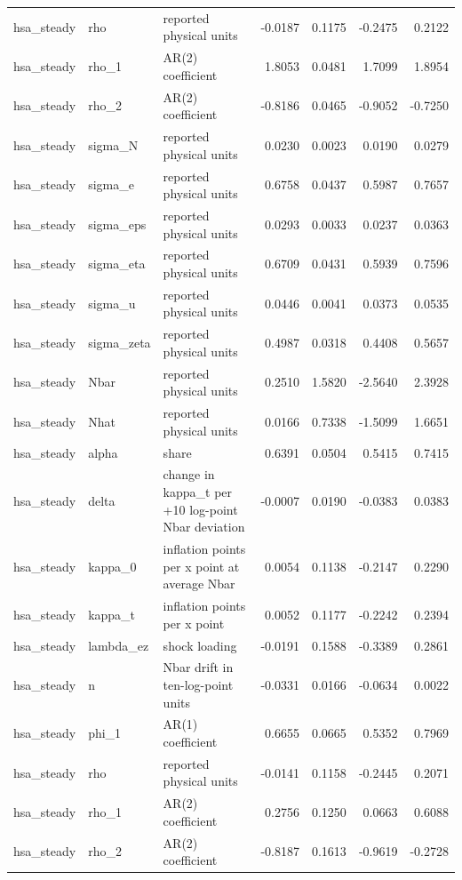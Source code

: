 \begin{tabular}{lllrrrr}
hsa\_steady & rho & reported physical units & -0.0187 & 0.1175 & -0.2475 & 0.2122 \\
hsa\_steady & rho\_1 & AR(2) coefficient & 1.8053 & 0.0481 & 1.7099 & 1.8954 \\
hsa\_steady & rho\_2 & AR(2) coefficient & -0.8186 & 0.0465 & -0.9052 & -0.7250 \\
hsa\_steady & sigma\_N & reported physical units & 0.0230 & 0.0023 & 0.0190 & 0.0279 \\
hsa\_steady & sigma\_e & reported physical units & 0.6758 & 0.0437 & 0.5987 & 0.7657 \\
hsa\_steady & sigma\_eps & reported physical units & 0.0293 & 0.0033 & 0.0237 & 0.0363 \\
hsa\_steady & sigma\_eta & reported physical units & 0.6709 & 0.0431 & 0.5939 & 0.7596 \\
hsa\_steady & sigma\_u & reported physical units & 0.0446 & 0.0041 & 0.0373 & 0.0535 \\
hsa\_steady & sigma\_zeta & reported physical units & 0.4987 & 0.0318 & 0.4408 & 0.5657 \\
hsa\_steady & Nbar & reported physical units & 0.2510 & 1.5820 & -2.5640 & 2.3928 \\
hsa\_steady & Nhat & reported physical units & 0.0166 & 0.7338 & -1.5099 & 1.6651 \\
hsa\_steady & alpha & share & 0.6391 & 0.0504 & 0.5415 & 0.7415 \\
hsa\_steady & delta & change in kappa\_t per +10 log-point Nbar deviation & -0.0007 & 0.0190 & -0.0383 & 0.0383 \\
hsa\_steady & kappa\_0 & inflation points per x point at average Nbar & 0.0054 & 0.1138 & -0.2147 & 0.2290 \\
hsa\_steady & kappa\_t & inflation points per x point & 0.0052 & 0.1177 & -0.2242 & 0.2394 \\
hsa\_steady & lambda\_ez & shock loading & -0.0191 & 0.1588 & -0.3389 & 0.2861 \\
hsa\_steady & n & Nbar drift in ten-log-point units & -0.0331 & 0.0166 & -0.0634 & 0.0022 \\
hsa\_steady & phi\_1 & AR(1) coefficient & 0.6655 & 0.0665 & 0.5352 & 0.7969 \\
hsa\_steady & rho & reported physical units & -0.0141 & 0.1158 & -0.2445 & 0.2071 \\
hsa\_steady & rho\_1 & AR(2) coefficient & 0.2756 & 0.1250 & 0.0663 & 0.6088 \\
hsa\_steady & rho\_2 & AR(2) coefficient & -0.8187 & 0.1613 & -0.9619 & -0.2728 \\

\end{tabular}
